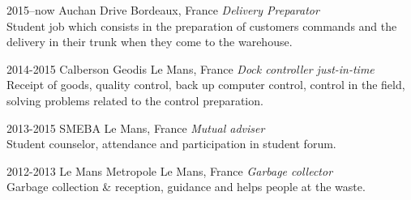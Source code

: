 \documentclass[]{friggeri-cv} %
\begin{document}
\begin{entrylist}

\entry
{2015--now}
{Auchan Drive}
{Bordeaux, France}
{\emph{Delivery Preparator} \\
Student job which consists in the preparation of customers commands and the delivery in their trunk when they come to the warehouse.} 


\entry
{2014-2015}
{Calberson Geodis}
{Le Mans, France}
{\emph{Dock controller just-in-time} \\
Receipt of goods, quality control, back up computer control, control in the field, solving problems related to the control preparation.}


\entry
{2013-2015}
{SMEBA}
{Le Mans, France}
{\emph{Mutual adviser} \\
Student counselor, attendance and participation in student forum.}


\entry
{2012-2013}
{Le Mans Metropole}
{Le Mans, France}
{\emph{Garbage collector} \\
Garbage collection \& reception, guidance and helps people at the waste.}


\end{entrylist}






\end{document}
